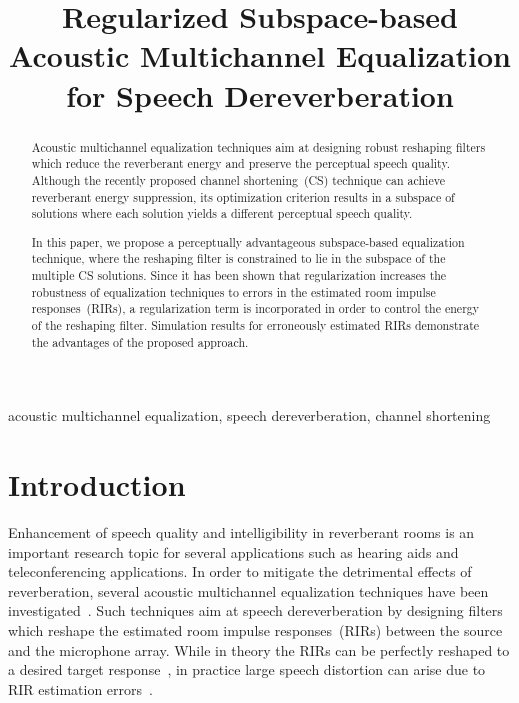 \documentclass{article}
\title{Regularized Subspace-based Acoustic Multichannel Equalization  \\ for Speech Dereverberation}
\begin{document}
\newlength\figureheight
\newlength\figurewidth
\setlength\figureheight{5.1cm}
\setlength\figurewidth{6.5cm}
%
\maketitle
%


\begin{abstract}
Acoustic multichannel equalization techniques aim at designing robust reshaping filters which reduce the reverberant energy and preserve the perceptual speech quality.
Although the recently proposed channel shortening~(CS) technique can achieve reverberant energy suppression, its optimization criterion results in a subspace of solutions where each solution yields a different perceptual speech quality.

In this paper, we propose a perceptually advantageous subspace-based equalization technique, where the reshaping filter is constrained to lie in the subspace of the multiple CS solutions.
Since it has been shown that regularization increases the robustness of equalization techniques to errors in the estimated room impulse responses~(RIRs), a regularization term is incorporated in order to control the energy of the reshaping filter.
Simulation results for erroneously estimated RIRs demonstrate the advantages of the proposed approach.
\end{abstract}
%
\begin{keywords}
acoustic multichannel equalization, speech dereverberation, channel shortening
\end{keywords}
%
\vspace{-0.25cm}
\section{Introduction}
\vspace{-0.25cm}

\label{sec:intro}
Enhancement of speech quality and intelligibility in reverberant rooms is an important research topic for several applications such as hearing aids and teleconferencing applications.
In order to mitigate the detrimental effects of reverberation, several acoustic multichannel equalization techniques have been investigated~\cite{Zhang_IWAENC_2010,Kodrasi_ITASLP_2013,Lim_IWAENC_2012,Miyoshi_ITASS_1988}.
Such techniques aim at speech dereverberation by designing filters which reshape the estimated room impulse responses~(RIRs) between the source and the microphone array.
While in theory the RIRs can be perfectly reshaped to a desired target response~\cite{Kodrasi_ITASLP_2013,Miyoshi_ITASS_1988}, in practice large speech distortion can arise due to RIR estimation errors~\cite{Hasan_EUSIPCO_2006}.
\end{document}

